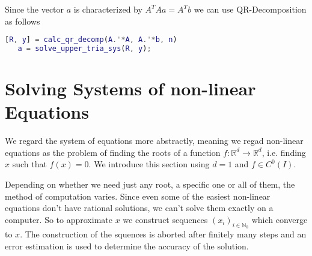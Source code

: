 Since the vector \(a\) is characterized by \(A^TAa = A^Tb\) we can use QR-Decomposition as follows
\begin{lstlisting}[language=Matlab, caption={Line Fitting with QR-Decomposition}]
   [R, y] = calc_qr_decomp(A.'*A, A.'*b, n)
   a = solve_upper_tria_sys(R, y);\end{lstlisting}

\section{Solving Systems of non-linear Equations}
We regard the system of equations more abstractly, meaning we regad non-linear equations as the problem of finding the roots of a function \(f: \mathbb{R}^d \to \mathbb{R}^d\), i.e. finding \(x\) such that \(f(x) = 0\).
We introduce this section using \(d = 1\) and \(f \in C^0(I)\).

Depending on whether we need just any root, a specific one or all of them, the method of computation varies.
Since even some of the easiest non-linear equations don't have rational solutions, we can't solve them exactly on a computer.
So to approximate \(x\) we construct sequences \((x_i)_{i \in \mathbb{N}_0}\) which converge to \(x\).
The construction of the squences is aborted after finitely many steps and an error estimation is used to determine the accuracy of the solution.

